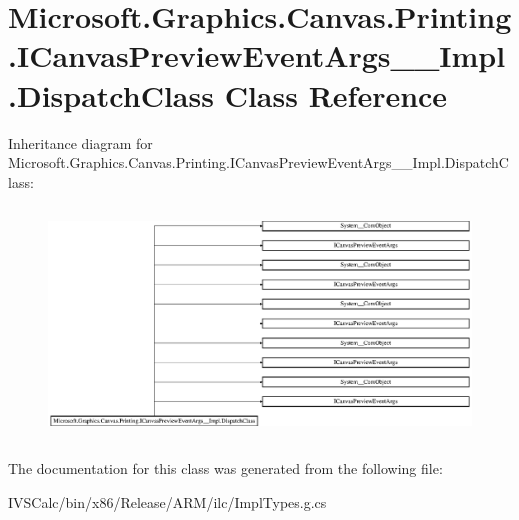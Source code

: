 \hypertarget{class_microsoft_1_1_graphics_1_1_canvas_1_1_printing_1_1_i_canvas_preview_event_args_____impl_1_1_dispatch_class}{}\section{Microsoft.\+Graphics.\+Canvas.\+Printing.\+I\+Canvas\+Preview\+Event\+Args\+\_\+\+\_\+\+Impl.\+Dispatch\+Class Class Reference}
\label{class_microsoft_1_1_graphics_1_1_canvas_1_1_printing_1_1_i_canvas_preview_event_args_____impl_1_1_dispatch_class}
Inheritance diagram for Microsoft.\+Graphics.\+Canvas.\+Printing.\+I\+Canvas\+Preview\+Event\+Args\+\_\+\+\_\+\+Impl.\+Dispatch\+Class\+:\begin{figure}[H]
\begin{center}
\leavevmode
\includegraphics[height=6.197183cm]{class_microsoft_1_1_graphics_1_1_canvas_1_1_printing_1_1_i_canvas_preview_event_args_____impl_1_1_dispatch_class}
\end{center}
\end{figure}


The documentation for this class was generated from the following file\+:\begin{DoxyCompactItemize}
\item 
I\+V\+S\+Calc/bin/x86/\+Release/\+A\+R\+M/ilc/Impl\+Types.\+g.\+cs\end{DoxyCompactItemize}
